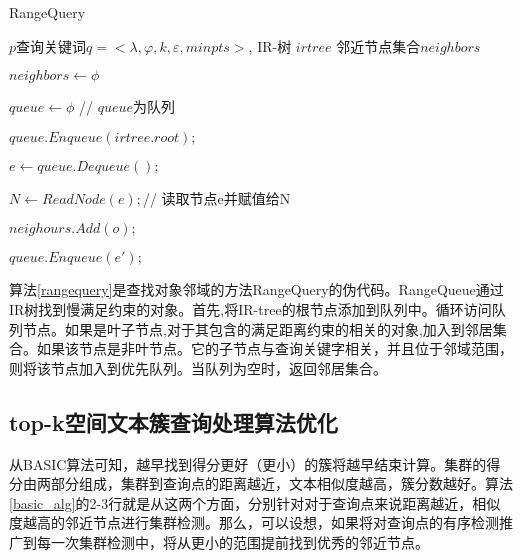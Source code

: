 \begin{algorithm}
	\caption{RangeQuery}
	\label{rangequery}
	\begin{algorithmic}[1] %
			\Require $p$查询关键词$q=<\lambda,\varphi,k,\varepsilon, minpts>$, IR-树 $irtree$
			\Ensure 邻近节点集合$neighbors$

			\State $neighbors \gets \phi$

			\State $queue \gets \phi$ // $queue$为队列
			
			\State $queue.Enqueue( irtree.root);$


				\State $e \gets queue.Dequeue();$

				\State $N \gets ReadNode(e); $// 读取节点e并赋值给N

					 
							 
											\State  $neighours.Add(o);$
									\EndIf
								\EndFor
						\Else



									\State $queue.Enqueue(e');$

								\EndIf
							
							\EndFor
							
						\EndIf
			
						
			\EndWhile
		\State {}
	\end{algorithmic}
\end{algorithm}

算法\ref{rangequery}是查找对象邻域的方法RangeQuery的伪代码。RangeQueue通过IR树找到慢满足约束的对象。首先,将IR-tree的根节点添加到队列中。循环访问队列节点。如果是叶子节点,对于其包含的满足距离约束的相关的对象,加入到邻居集合。如果该节点是非叶节点。它的子节点与查询关键字相关，并且位于邻域范围，则将该节点加入到优先队列。当队列为空时，返回邻居集合。

\subsection{top-k空间文本簇查询处理算法优化}

从BASIC算法可知，越早找到得分更好（更小）的簇将越早结束计算。集群的得分由两部分组成，集群到查询点的距离越近，文本相似度越高，簇分数越好。算法\ref{basic_alg}的2-3行就是从这两个方面，分别针对对于查询点来说距离越近，相似度越高的邻近节点进行集群检测。那么，可以设想，如果将对查询点的有序检测推广到每一次集群检测中，将从更小的范围提前找到优秀的邻近节点。

